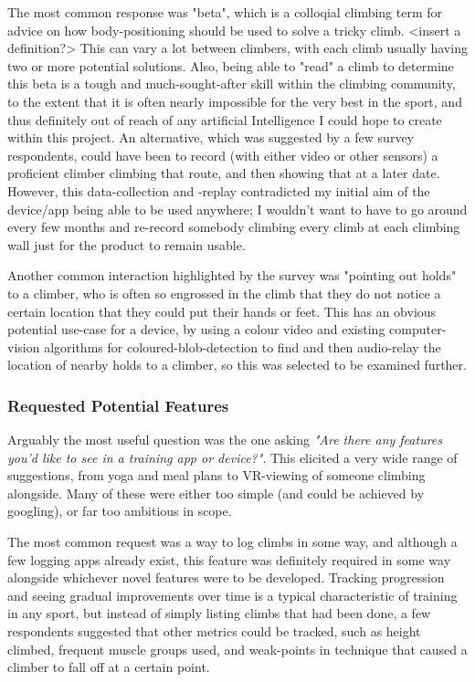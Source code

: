 The most common response was "beta", which is a colloqial climbing term for advice on how body-positioning should be used to solve a tricky climb. 
<insert a definition?>
This can vary a lot between climbers, with each climb usually having two or more potential solutions.
Also, being able to "read" a climb to determine this beta is a tough and much-sought-after skill within the climbing community, to the extent that it is often nearly impossible for the very best in the sport, and thus definitely out of reach of any artificial Intelligence I could hope to create within this project.
An alternative, which was suggested by a few survey respondents, could have been to record (with either video or other sensors) a proficient climber climbing that route, and then showing that at a later date. 
However, this data-collection and -replay contradicted my initial aim of the device/app being able to be used anywhere; I wouldn't want to have to go around every few months and re-record somebody climbing every climb at each climbing wall just for the product to remain usable.

Another common interaction highlighted by the survey was "pointing out holds" to a climber, who is often so engrossed in the climb that they do not notice a certain location that they could put their hands or feet.
This has an obvious potential use-case for a device, by using a colour video and existing computer-vision algorithms for coloured-blob-detection to find and then audio-relay the location of nearby holds to a climber, so this was selected to be examined further.



\subsubsection{Requested Potential Features}
Arguably the most useful question was the one asking
\textit{"Are there any features you'd like to see in a training app or device?"}.
This elicited a very wide range of suggestions, from yoga and meal plans to VR-viewing of someone climbing alongside.
Many of these were either too simple (and could be achieved by googling), or far too ambitious in scope.

The most common request was a way to log climbs in some way, and although a few logging apps already exist, this feature was definitely required in some way alongside whichever novel features were to be developed.
Tracking progression and seeing gradual improvements over time is a typical characteristic of training in any sport, but instead of simply listing climbs that had been done, a few respondents suggested that other metrics could be tracked, such as height climbed, frequent muscle groups used, and weak-points in technique that caused a climber to fall off at a certain point.


